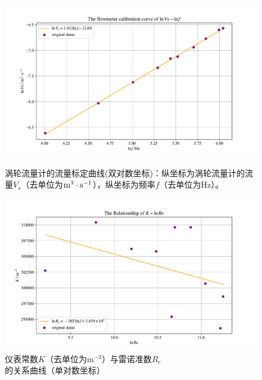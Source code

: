 \documentclass[UTF8,AutoFakeBold,a4paper]{article}
\begin{document}
\newpage
\begin{figure}[h]
	\centering
	\includegraphics[scale=0.6]{涡轮1}
	\caption{涡轮流量计的流量标定曲线(双对数坐标)：纵坐标为涡轮流量计的流量$V_{s}$（去单位为$\rm{m}^{3}\cdot\rm{s}^{-1}$），纵坐标为频率$f$（去单位为Hz）。}
	\label{fi3}
	
	\centering
	\includegraphics[scale=0.6]{涡轮2}
	\caption{仪表常数$K$（去单位为m$^{-3}$）与雷诺准数$R_{e}$的关系曲线（单对数坐标）}
	\label{fi4}
\end{figure}
\end{document}
